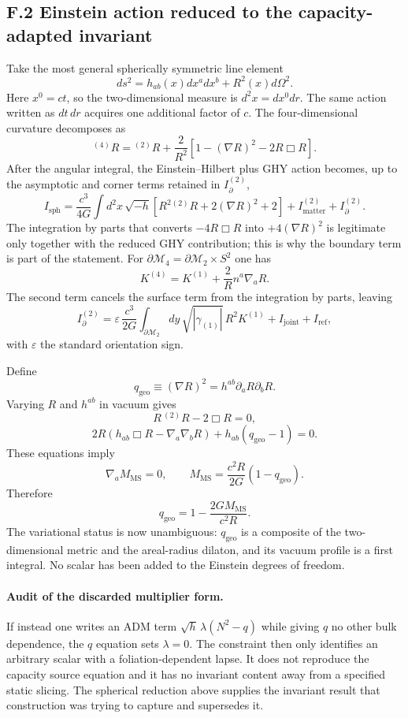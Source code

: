 \documentclass[11pt]{article}
\begin{document}
\subsection*{F.2 Einstein action reduced to the capacity-adapted invariant}

Take the most general spherically symmetric line element
\[
ds^2=h_{ab}(x)dx^adx^b+R^2(x)d\Omega^2.
\]
Here $x^0=ct$, so the two-dimensional measure is $d^2x=dx^0dr$. The same action written as $dt\,dr$ acquires one additional factor of $c$.
The four-dimensional curvature decomposes as
\[
{}^{(4)}R
=
{}^{(2)}R
+\frac{2}{R^2}\left[1-(\nabla R)^2-2R\Box R\right].
\]
After the angular integral, the Einstein--Hilbert plus GHY action becomes, up to the asymptotic and corner terms retained in $I_\partial^{(2)}$,
\[
I_{\mathrm{sph}}
=
\frac{c^3}{4G}\int d^2x\,\sqrt{-h}
\left[
R^2{}^{(2)}R+2(\nabla R)^2+2
\right]
+I_{\mathrm{matter}}^{(2)}+I_\partial^{(2)}.
\]
The integration by parts that converts $-4R\Box R$ into $+4(\nabla R)^2$ is legitimate only together with the reduced GHY contribution; this is why the boundary term is part of the statement.
For $\partial\mathcal M_4=\partial\mathcal M_2\times S^2$ one has
\[
K^{(4)}=K^{(1)}+\frac{2}{R}n^a\nabla_aR.
\]
The second term cancels the surface term from the integration by parts, leaving
\[
I_\partial^{(2)}
=\varepsilon\,\frac{c^3}{2G}
\int_{\partial\mathcal M_2}dy\,
\sqrt{|\gamma_{(1)}|}\,R^2K^{(1)}
+I_{\mathrm{joint}}+I_{\mathrm{ref}},
\]
with $\varepsilon$ the standard orientation sign.

Define
\[
q_{\mathrm{geo}}\equiv(\nabla R)^2
=h^{ab}\partial_aR\partial_bR.
\]
Varying $R$ and $h^{ab}$ in vacuum gives
\[
R\,{}^{(2)}R-2\Box R=0,
\]
\[
2R\left(h_{ab}\Box R-\nabla_a\nabla_bR\right)
+h_{ab}(q_{\mathrm{geo}}-1)=0.
\]
These equations imply
\[
\nabla_aM_{\mathrm{MS}}=0,
\qquad
M_{\mathrm{MS}}
=\frac{c^2R}{2G}(1-q_{\mathrm{geo}}).
\]
Therefore
\[
q_{\mathrm{geo}}
=1-\frac{2GM_{\mathrm{MS}}}{c^2R}.
\]
The variational status is now unambiguous: $q_{\mathrm{geo}}$ is a composite of the two-dimensional metric and the areal-radius dilaton, and its vacuum profile is a first integral. No scalar has been added to the Einstein degrees of freedom.

\paragraph{Audit of the discarded multiplier form.}
If instead one writes an ADM term $\sqrt h\,\lambda(N^2-q)$ while giving $q$ no other bulk dependence, the $q$ equation sets $\lambda=0$. The constraint then only identifies an arbitrary scalar with a foliation-dependent lapse. It does not reproduce the capacity source equation and it has no invariant content away from a specified static slicing. The spherical reduction above supplies the invariant result that construction was trying to capture and supersedes it.
\end{document}
